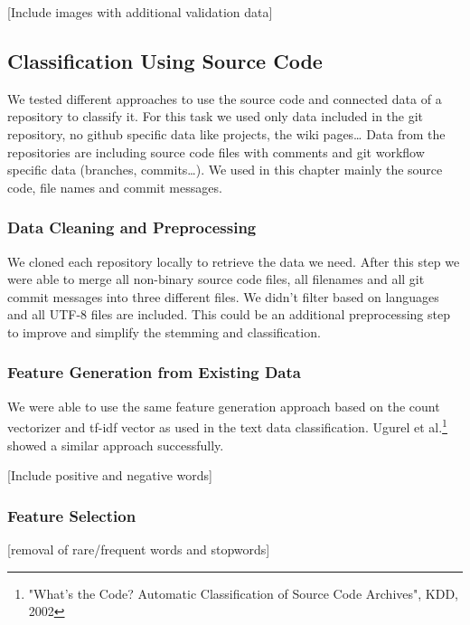 \documentclass[a4paper,12pt]{article}
\begin{document}
{[}Include images with additional validation data{]}

\subsection{Classification Using Source
Code}\label{classification-using-source-code}

We tested different approaches to use the source code and connected data
of a repository to classify it. For this task we used only data included
in the git repository, no github specific data like projects, the wiki
pages\ldots{} Data from the repositories are including source code files
with comments and git workflow specific data (branches,
commits\ldots{}). We used in this chapter mainly the source code, file
names and commit messages.

\subsubsection{Data Cleaning and
Preprocessing}\label{data-cleaning-and-preprocessing-2}

We cloned each repository locally to retrieve the data we need. After
this step we were able to merge all non-binary source code files, all
filenames and all git commit messages into three different files. We
didn't filter based on languages and all UTF-8 files are included. This
could be an additional preprocessing step to improve and simplify the
stemming and classification.

\subsubsection{Feature Generation from Existing
Data}\label{feature-generation-from-existing-data-1}

We were able to use the same feature generation approach based on the
count vectorizer and tf-idf vector as used in the text data
classification.
Ugurel et al.\footnote{"What's the Code? Automatic Classification of Source Code Archives", KDD, 2002} showed a similar approach successfully.

[Include positive and negative words]

\subsubsection{Feature Selection}\label{feature-selection-2}

{[}removal of rare/frequent words and stopwords{]}
\end{document}
